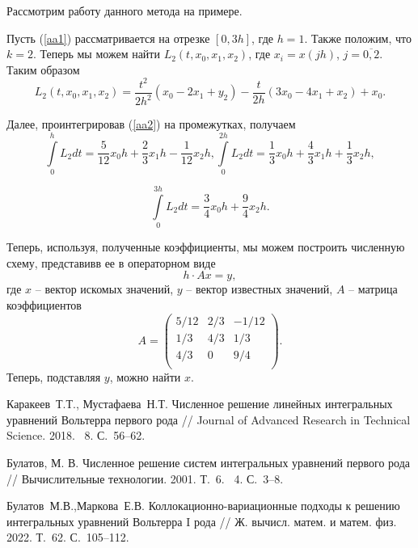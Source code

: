 \documentclass[12pt]{llncs}  %
\begin{document}
Рассмотрим работу данного метода на примере.

Пусть (\ref{aa1}) рассматривается на отрезке $[0,3h]$, где $h=1$. Также положим, что $k=2$. Теперь мы можем найти $L_2(t,x_0,x_1,x_2)$, где $x_i=x(jh)$, $j=\overline{0,2}$. Таким образом 
\begin{equation}\label{aa2}
L_2(t,x_0,x_1,x_2)=\frac{t^2}{2h^2}(x_0-2x_1+y_2)-\frac{t}{2h}(3x_0-4x_1+x_2)+x_0.
\end{equation}

Далее, проинтегрировав (\ref{aa2}) на промежутках, получаем
\begin{equation}
\int \limits_0^{h} L_2dt=
\frac{5}{12}x_0 h+\frac{2}{3}x_1 h-\frac{1}{12}x_2 h,
\int \limits_0^{2h} L_2dt=
\frac{1}{3}x_0 h+\frac{4}{3}x_1 h+\frac{1}{3}x_2 h,
\end{equation}

\begin{equation}\label{aa3}
\int \limits_0^{3h} L_2dt=
\frac{3}{4}x_0 h+\frac{9}{4}x_2 h.
\end{equation}

Теперь, используя, полученные коэффициенты, мы можем построить численную схему, представивв ее в операторном виде
\begin{equation*}
h\cdot Ax=y,
\end{equation*}
где $x$ -- вектор искомых значений, $y$ -- вектор известных значений, $A$ -- матрица коэффициентов
\begin{equation*}
A=
\begin{pmatrix}
   5/12 & 2/3&  -1/12\\
   1/3  & 4/3&  1/3\\
   4/3& 0&  9/4\\
\end{pmatrix}.
\end{equation*}
Теперь, подставляя $y$, можно найти $x$.

\begin{thebibliography}{9} %

 Каракеев~Т.Т., Мустафаева~Н.Т. Численное решение линейных интегральных уравнений Вольтерра первого рода // Journal of Advanced Research in Technical Science. 2018. \textnumero~8.  С.~56--62. 

 Булатов, М. В. Численное решение систем интегральных уравнений первого рода // Вычислительные технологии. 2001. Т.~6. \textnumero~4.  С.~3--8.

 Булатов~М.В.,Маркова~Е.В.  Коллокационно-вариационные подходы к решению интегральных уравнений Вольтерра I рода // Ж. вычисл. матем. и матем. физ. 2022. Т.~62. С.~105--112.


\end{thebibliography}






\end{document}
